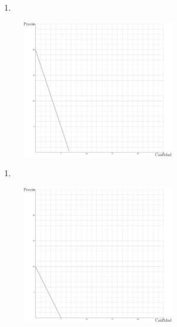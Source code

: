 \documentclass[
  letterpaper,
  DIV=11,
  numbers=noendperiod]{scrreport}
\providecommand{\tightlist}{%
  \setlength{\itemsep}{0pt}\setlength{\parskip}{0pt}}\usepackage{longtable,booktabs,array}
\begin{document}
\newpage

\begin{enumerate}
\def\labelenumi{\arabic{enumi})}
\setcounter{enumi}{1}
\tightlist
\item
\end{enumerate}

\begin{figure}

{\centering \includegraphics[width=0.6\textwidth,height=\textheight]{7ej_propuestos_files/figure-pdf/unnamed-chunk-2-1.pdf}

}

\end{figure}

\newpage

\begin{enumerate}
\def\labelenumi{\arabic{enumi})}
\setcounter{enumi}{2}
\tightlist
\item
\end{enumerate}

\begin{figure}

{\centering \includegraphics[width=0.6\textwidth,height=\textheight]{7ej_propuestos_files/figure-pdf/unnamed-chunk-3-1.pdf}

}

\end{figure}
\end{document}
